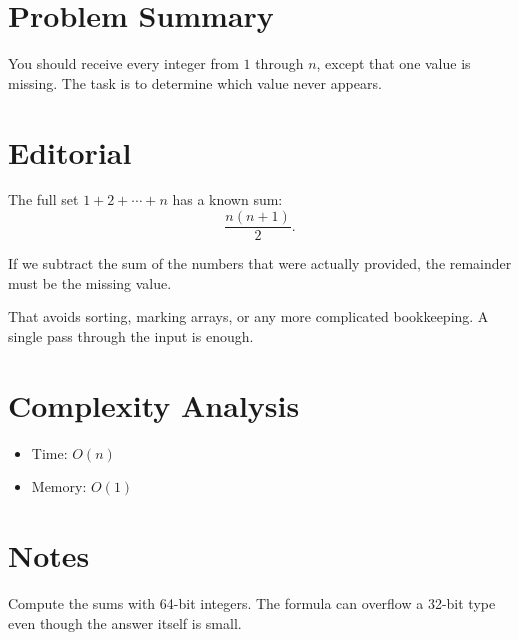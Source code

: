 \section{Problem Summary}
You should receive every integer from \(1\) through \(n\), except that one value is missing. The task is to determine which value never appears.

\section{Editorial}
The full set \(1 + 2 + \cdots + n\) has a known sum:
\[
\frac{n(n + 1)}{2}.
\]

If we subtract the sum of the numbers that were actually provided, the remainder must be the missing value.

That avoids sorting, marking arrays, or any more complicated bookkeeping. A single pass through the input is enough.

\section{Complexity Analysis}
\begin{itemize}
\item Time: \(O(n)\)
\item Memory: \(O(1)\)
\end{itemize}

\section{Notes}
Compute the sums with 64-bit integers. The formula can overflow a 32-bit type even though the answer itself is small.
